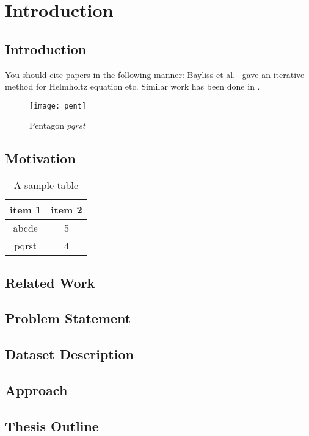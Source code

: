 \chapter{Introduction}


\section{Introduction}

You should cite papers in the following manner: Bayliss et al.~\cite{Bay1} gave an iterative method for Helmholtz equation etc.
Similar work has been done in \cite{Bailey,Ernst,Gold3}.

\begin{figure}[here]
\begin{center}	
\texttt{[image: pent]} 
\caption{Pentagon $pqrst$}
\label{fig:pent}
\end{center}
\end{figure}


\section{Motivation}

\begin{table}
\centering
\begin{tabular}{| c | c |}
\hline
{\bf item 1} & {\bf item 2} \\ \hline
%
abcde & 5 \\ \hline
%
pqrst & 4 \\ \hline
\end{tabular}
\caption{A sample table}
\label{table:1}
\end{table}

\section{Related Work}
\section{Problem Statement}
\section{Dataset Description}
\section{Approach}
\section{Thesis Outline}

